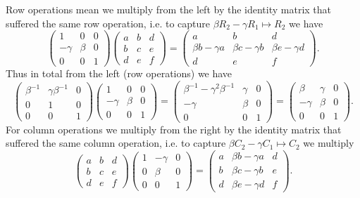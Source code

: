 \begin{calc}
Row operations mean we multiply from the left by the identity matrix that suffered the same row operation, i.e. to capture $\beta R_2 - \gamma R_1 \mapsto R_2$ we have
\[
\begin{pmatrix} 1 & 0 & 0 \\ -\gamma & \beta & 0 \\ 0 & 0 & 1 \end{pmatrix}
\begin{pmatrix} a & b & d \\ b & c & e \\ d & e & f \end{pmatrix}
= \begin{pmatrix} a & b & d \\ \beta b - \gamma a & \beta c - \gamma b & \beta e - \gamma d \\ d & e & f \end{pmatrix}.
\]
Thus in total from the left (row operations) we have
\[
\begin{pmatrix} \beta^{-1} & \gamma\beta^{-1} & 0 \\ 0 & 1 & 0 \\ 0 & 0 & 1 \end{pmatrix}
\begin{pmatrix} 1 & 0 & 0 \\ -\gamma & \beta & 0 \\ 0 & 0 & 1 \end{pmatrix}
= \begin{pmatrix} \beta^{-1} - \gamma^2\beta^{-1} & \gamma & 0 \\ -\gamma & \beta & 0 \\ 0 & 0 & 1 \end{pmatrix}
= \begin{pmatrix} \beta & \gamma & 0 \\ -\gamma & \beta & 0 \\ 0 & 0 & 1 \end{pmatrix}.
\]
For column operations we multiply from the right by the identity matrix that suffered the same column operation, i.e. to capture $\beta C_2 - \gamma C_1 \mapsto C_2$ we multiply
\[
\begin{pmatrix} a & b & d \\ b & c & e \\ d & e & f \end{pmatrix}
\begin{pmatrix} 1 & -\gamma & 0 \\ 0 & \beta & 0 \\ 0 & 0 & 1 \end{pmatrix}
= \begin{pmatrix} a & \beta b - \gamma a & d \\ b & \beta c - \gamma b & e \\ d & \beta e - \gamma d & f \end{pmatrix}.
\]
\end{calc}

